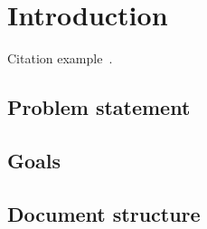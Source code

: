 \section{Introduction}
Citation example~\autocite{FooAuthor}.
\subsection{Problem statement}
\subsection{Goals}
\subsection{Document structure}
